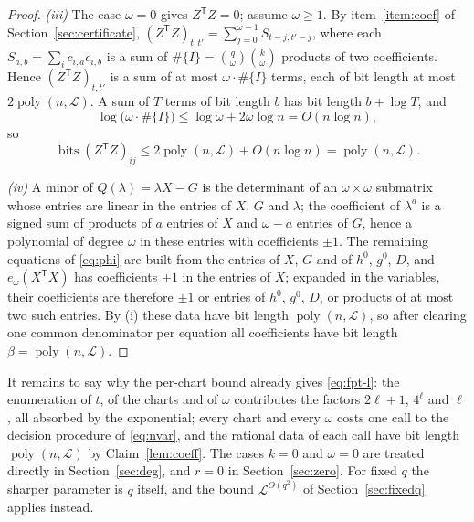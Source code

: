 \documentclass[journal]{IEEEtran}
\theoremstyle{plainn}
\theoremstyle{remark}
\begin{document}
\begin{proof}
\emph{(iii)} The case $\omega=0$ gives $Z^{\mathsf T}Z=0$; assume $\omega\ge1$. By
item~\ref{item:coef} of Section~\ref{sec:certificate},
$(Z^{\mathsf T}Z)_{t,t'}=\sum_{j=0}^{\omega-1}S_{t-j,t'-j}$, where each
$S_{a,b}=\sum_ic_{i,a}c_{i,b}$ is a sum of $\#\{I\}=\binom q\omega\binom k\omega$ products of two
coefficients. Hence $(Z^{\mathsf T}Z)_{t,t'}$ is a sum of at most $\omega\cdot\#\{I\}$ terms, each
of bit length at most $2\operatorname{poly}(n,\mathcal L)$. A sum of $T$ terms of bit length $b$ has
bit length $b+\log T$, and
\begin{equation*}
\log\bigl(\omega\cdot\#\{I\}\bigr)\le\log\omega+2\omega\log n=O(n\log n),
\end{equation*}
so
\begin{equation*}
\operatorname{bits}(Z^{\mathsf T}Z)_{ij}
\le2\operatorname{poly}(n,\mathcal L)+O(n\log n)
=\operatorname{poly}(n,\mathcal L).
\end{equation*}

\emph{(iv)} A minor of $Q(\lambda)=\lambda X-G$ is the determinant of an $\omega\times\omega$
submatrix whose entries are linear in the entries of $X$, $G$ and $\lambda$; the coefficient of
$\lambda^a$ is a signed sum of products of $a$ entries of $X$ and $\omega-a$ entries of $G$, hence a
polynomial of degree $\omega$ in these entries with coefficients $\pm1$. The remaining equations of
\eqref{eq:phi} are built from the entries of $X$, $G$ and of $h^0$, $g^0$, $D$, and $e_\omega(X^{\mathsf
T}X)$ has coefficients $\pm1$ in the entries of $X$; expanded in the variables, their coefficients are
therefore $\pm1$ or entries of $h^0$, $g^0$, $D$, or products of at most two such entries. By (i) these
data have bit length $\operatorname{poly}(n,\mathcal L)$, so after clearing one common denominator per
equation all coefficients have bit length $\beta=\operatorname{poly}(n,\mathcal L)$.
\end{proof}

It remains to say why the per-chart bound already gives \eqref{eq:fpt-l}: the enumeration of
$t$, of the charts and of $\omega$ contributes the factors $2\ell+1$, $4^{\ell}$ and $\ell$, all
absorbed by the exponential; every chart and every $\omega$ costs one call to the decision procedure
of \eqref{eq:nvar}, and the rational data of each call have bit length
$\operatorname{poly}(n,\mathcal L)$ by Claim~\ref{lem:coeff}. The cases $k=0$ and $\omega=0$
are treated directly in Section~\ref{sec:deg}, and $r=0$ in Section~\ref{sec:zero}. For fixed $q$
the sharper parameter is $q$ itself, and the bound $\mathcal L^{O(q^2)}$ of
Section~\ref{sec:fixedq} applies instead.
\end{document}
